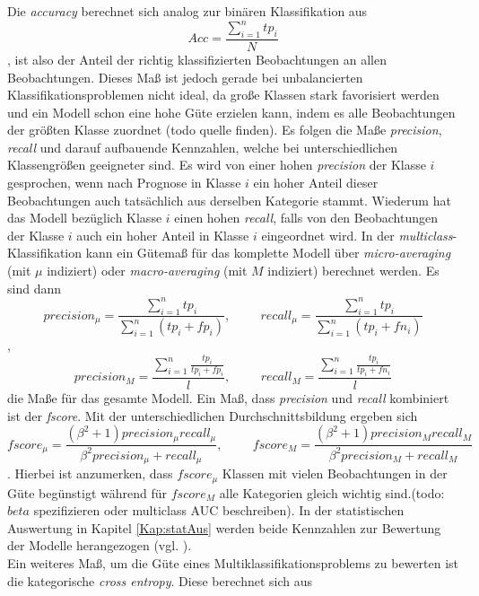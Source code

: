 \documentclass[a4paper,11pt]{article}
\begin{document}
Die \textit{accuracy} berechnet sich analog zur binären Klassifikation aus 
\[ Acc = \frac{\sum_{i=1}^n tp_i}{N} \],
ist also der Anteil der richtig klassifizierten Beobachtungen an allen Beobachtungen. Dieses Maß ist jedoch gerade bei unbalancierten Klassifikationsproblemen nicht ideal, da große Klassen stark favorisiert werden und ein Modell schon eine hohe Güte erzielen kann, indem es alle Beobachtungen der größten Klasse zuordnet (todo quelle finden). Es folgen die Maße \textit{precision}, \textit{recall} und darauf aufbauende Kennzahlen, welche bei unterschiedlichen Klassengrößen geeigneter sind. Es wird von einer hohen \textit{precision} der Klasse $i$gesprochen, wenn nach Prognose in Klasse $i$ ein hoher Anteil dieser Beobachtungen auch tatsächlich aus derselben Kategorie stammt. Wiederum hat das Modell bezüglich Klasse $i$ einen hohen \textit{recall}, falls von den Beobachtungen der Klasse $i$ auch ein hoher Anteil in Klasse $i$ eingeordnet wird.
In der \textit{multiclass}-Klassifikation kann ein Gütemaß für das komplette Modell über \textit{micro-averaging} (mit $\mu$ indiziert) oder \textit{macro-averaging} (mit $M$ indiziert) berechnet werden. Es sind dann 
\[ precision_{\mu} = \frac{\sum_{i = 1}^n tp_i}{\sum_{i = 1}^n (tp_i + fp_i)}, \hspace{1cm} recall_{\mu} = \frac{\sum_{i = 1}^n tp_i}{\sum_{i = 1}^n (tp_i + fn_i)}\],
\[ precision_M = \frac{\sum_{i = 1}^n \frac{tp_i}{tp_i + fp_i} }{l}, \hspace{1cm} recall_M = \frac{\sum_{i = 1}^n \frac{tp_i}{tp_i + fn_i} }{l}\]
die Maße für das gesamte Modell. Ein Maß, dass \textit{precision} und \textit{recall} kombiniert ist der \textit{fscore}. Mit der unterschiedlichen Durchschnittsbildung ergeben sich
\[ fscore_{\mu} = \frac{(\beta^2+1) precision_{\mu} recall_{\mu}}{\beta^2 precision_{\mu}+ recall_{\mu}}, \hspace{1cm} fscore_{M} = \frac{(\beta^2+1) precision_{M} recall_{M}}{\beta^2 precision_{M}+ recall_{M}} \].
Hierbei ist anzumerken, dass $fscore_{\mu}$ Klassen mit vielen Beobachtungen in der Güte begünstigt während für $fscore_M$ alle Kategorien gleich wichtig sind.(todo: $beta$ spezifizieren oder multiclass AUC beschreiben).  In der statistischen Auswertung in Kapitel \ref{Kap:statAus} werden beide Kennzahlen zur Bewertung der Modelle herangezogen (vgl. \cite{sokolova}).\\

Ein weiteres Maß, um die Güte eines Multiklassifikationsproblems zu bewerten ist die kategorische \textit{cross entropy}. Diese berechnet sich aus
\end{document}
